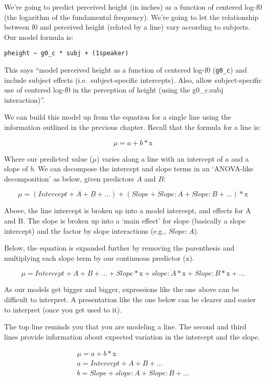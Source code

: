 \documentclass[
]{book}
\begin{document}
We're going to predict perceived height (in inches) as a function of centered log-f0 (the logarithm of the fundamental frequency). We're going to let the relationship between f0 and perceived height (related by a line) vary according to subjects. Our model formula is:

\texttt{pheight\ \textasciitilde{}\ g0\_c\ *\ subj\ +\ (1\textbar{}speaker)}

This says ``model perceived height as a function of centered log-f0 (\texttt{g0\_c}) and include subject effects (i.e.~subject-specific intercepts). Also, allow subject-specific use of centered log-f0 in the perception of height (using the g0\_c:subj interaction)''.

We can build this model up from the equation for a single line using the information outlined in the previous chapter. Recall that the formula for a line is:

\[
\mu = a + b * \mathrm{x}
\label{eq:61}
\]

Where our predicted value (\(\mu\)) varies along a line with an intercept of \(a\) and a slope of \(b\). We can decompose the intercept and slope terms in an `ANOVA-like decomposition' as below, given predictors \(A\) and \(B\):

\[
\mu = (Intercept + A + B + ...) + (Slope + Slope \colon A + Slope \colon B + ...) * \mathrm{x}
\label{eq:62}
\]

Above, the line intercept is broken up into a model intercept, and effects for A and B. The slope is broken up into a `main effect' for slope (basically a slope intercept) and the factor by slope interactions (e.g., \(Slope \colon A\)).

Below, the equation is expanded further by removing the parenthesis and multiplying each slope term by our continuous predictor (\(\mathrm{x}\)).

\[
\mu = Intercept + A + B + ... + Slope* \mathrm{x} + slope \colon A* \mathrm{x} + Slope \colon B* \mathrm{x} + ...
\label{eq:63}
\]

As our models get bigger and bigger, expressions like the one above can be difficult to interpret. A presentation like the one below can be clearer and easier to interpret (once you get used to it).

The top line reminds you that you are modeling a line. The second and third lines provide information about expected variation in the intercept and the slope.

\begin{equation}
\begin{split}
\mu = a + b * \mathrm{x} \\
a = Intercept + A + B + ... \\
b = Slope + slope \colon A + Slope \colon B + ... \\
\end{split}
\label{eq:64}
\end{equation}
\end{document}
